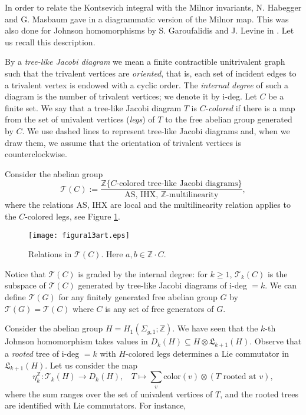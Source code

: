 \documentclass[10pt]{amsart}
\numberwithin{equation}{section}
\numberwithin{equation}{section}
\theoremstyle{definition}
\begin{document}
In order to relate the Kontsevich integral with the Milnor invariants, N. Habegger and G. Masbaum gave in \cite{MR1783857} a diagrammatic version of the Milnor map. This was also  done for Johnson homomorphisms by S. Garoufalidis and J. Levine  in \cite{MR2131016}. Let us recall this description.

By a \emph{tree-like Jacobi diagram} we mean a finite contractible unitrivalent graph such that the trivalent vertices are \emph{oriented}, that is, each set of incident edges to a trivalent vertex is endowed with a cyclic order. The \emph{internal degree} of such a diagram is the number of trivalent vertices; we denote it by i-deg.
Let $C$ be a finite set. We say that a tree-like Jacobi diagram $T$ is   $C$-\emph{colored} if there is a map from the set of univalent vertices (\emph{legs}) of $T$ to the free abelian group generated by $C$. We use dashed lines to represent tree-like Jacobi diagrams and, when we draw them, we assume that the orientation of trivalent vertices is counterclockwise.

Consider the  abelian group
$$\mathcal{T}(C):=\frac{\mathbb{Z}\{C\text{-colored tree-like Jacobi diagrams}\}}{\text{AS, IHX, $\mathbb{Z}$-multilinearity}},$$
\noindent where the relations AS, IHX are local  and the multilinearity relation applies to the $C$-colored legs, see Figure \ref{figura4.13}.
\begin{figure}[ht!] 
										\centering
                        \texttt{[image: figura13art.eps]}
												\caption{Relations in $\mathcal{T}(C)$. Here $a,b\in \mathbb{Z}\cdot C$.}
												\label{figura4.13}
\end{figure}

 \noindent Notice that $\mathcal{T}(C)$ is graded by the internal degree: for $k\geq 1$, $\mathcal{T}_k(C)$ is the subspace of $\mathcal{T}(C)$ generated by tree-like Jacobi diagrams of i-deg $=k$. We can define $\mathcal{T}(G)$ for any finitely generated free abelian group $G$ by  $\mathcal{T}(G)=\mathcal{T}(C)$ where $C$ is any set of free generators of $G$. 

Consider the abelian group $H=H_1(\Sigma_{g,1};\mathbb{Z})$. We have seen  that the $k$-th Johnson homomorphism takes values in $D_k(H)\subseteq H\otimes\mathfrak{L}_{k+1}(H)$. Observe that a \emph{rooted} tree of i-deg $=k$ with $H$-colored legs determines a Lie commutator in $\mathfrak{L}_{k+1}(H)$. Let us consider the map 
\begin{equation}\label{ecuacion4.15tree}%
\eta^{\mathbb{Z}}_k:\mathcal{T}_k(H)\longrightarrow D_k(H),\ \ \ \ T\longmapsto\sum_v \text{color}(v)\otimes (T \text{ rooted at } v),
\end{equation}
where the sum ranges over the set of univalent vertices of $T$, and the rooted trees are identified with Lie commutators. For instance,
\end{document}
